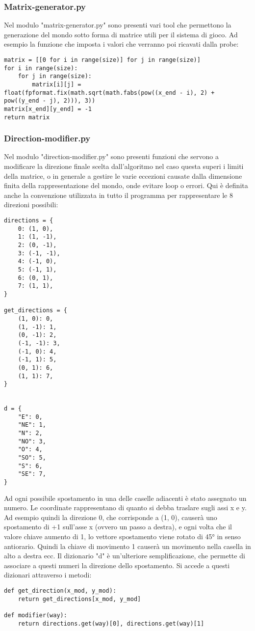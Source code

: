 \subsubsection{Matrix-generator.py}
Nel modulo "matrix-generator.py" sono presenti vari tool che permettono la generazione del mondo sotto forma di matrice utili per il sistema di gioco. Ad esempio la funzione che imposta i valori che verranno poi ricavati dalla probe:
\begin{verbatim}
matrix = [[0 for i in range(size)] for j in range(size)]
for i in range(size):
    for j in range(size):
        matrix[i][j] = float(fpformat.fix(math.sqrt(math.fabs(pow((x_end - i), 2) + pow((y_end - j), 2))), 3))
matrix[x_end][y_end] = -1
return matrix
\end{verbatim}

\subsubsection{Direction-modifier.py}
Nel modulo "direction-modifier.py" sono presenti funzioni che servono a modificare la direzione finale scelta dall'algoritmo nel caso questa superi i limiti della matrice, o in generale a gestire le varie eccezioni causate dalla dimensione finita della rappresentazione del mondo, onde evitare loop o errori. Qui è definita anche la convenzione utilizzata in tutto il programma per rappresentare le 8 direzioni possibili:
\begin{verbatim}
directions = {
    0: (1, 0),
    1: (1, -1),
    2: (0, -1),
    3: (-1, -1),
    4: (-1, 0),
    5: (-1, 1),
    6: (0, 1),
    7: (1, 1),
}

get_directions = {
    (1, 0): 0,
    (1, -1): 1,
    (0, -1): 2,
    (-1, -1): 3,
    (-1, 0): 4,
    (-1, 1): 5,
    (0, 1): 6,
    (1, 1): 7,
}


d = {
    "E": 0,
    "NE": 1,
    "N": 2,
    "NO": 3,
    "O": 4,
    "SO": 5,
    "S": 6,
    "SE": 7,
}
\end{verbatim}

Ad ogni possibile spostamento in una delle caselle adiacenti è stato assegnato un numero. Le coordinate rappresentano di quanto si debba traslare sugli assi x e y. Ad esempio quindi la direzione 0, che corrisponde a (1, 0), causerà uno spostamento di +1 sull'asse x (ovvero un passo a destra), e ogni volta che il valore chiave aumento di 1, lo vettore spostamento viene rotato di 45° in senso antiorario. Quindi la chiave di movimento 1 causerà un movimento nella casella in alto a destra ecc. Il dizionario "d" è un'ulteriore semplificazione, che permette di associare a questi numeri la direzione dello spostamento. Si accede a questi dizionari attraverso i metodi:
\begin{verbatim}
def get_direction(x_mod, y_mod):
    return get_directions[x_mod, y_mod]

def modifier(way):
    return directions.get(way)[0], directions.get(way)[1]

\end{verbatim}

